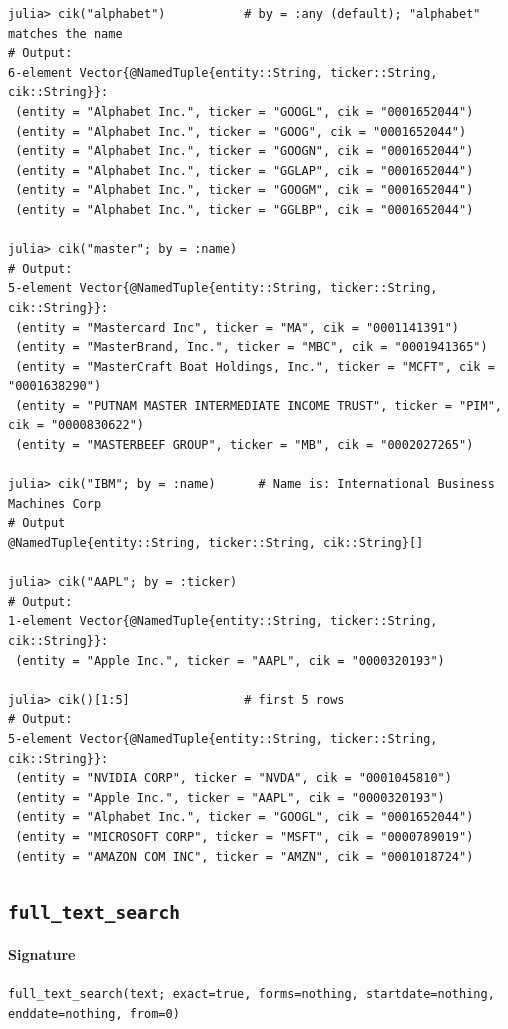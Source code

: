 \documentclass[11pt,a4paper]{report}
\newcommand{\sig}[1]{\medskip\noindent\texttt{#1}\par\medskip}
\begin{document}
\begin{lstlisting}
julia> cik("alphabet")           # by = :any (default); "alphabet" matches the name
# Output:
6-element Vector{@NamedTuple{entity::String, ticker::String, cik::String}}:
 (entity = "Alphabet Inc.", ticker = "GOOGL", cik = "0001652044")
 (entity = "Alphabet Inc.", ticker = "GOOG", cik = "0001652044")
 (entity = "Alphabet Inc.", ticker = "GOOGN", cik = "0001652044")
 (entity = "Alphabet Inc.", ticker = "GGLAP", cik = "0001652044")
 (entity = "Alphabet Inc.", ticker = "GOOGM", cik = "0001652044")
 (entity = "Alphabet Inc.", ticker = "GGLBP", cik = "0001652044")

julia> cik("master"; by = :name)
# Output:
5-element Vector{@NamedTuple{entity::String, ticker::String, cik::String}}:
 (entity = "Mastercard Inc", ticker = "MA", cik = "0001141391")
 (entity = "MasterBrand, Inc.", ticker = "MBC", cik = "0001941365")
 (entity = "MasterCraft Boat Holdings, Inc.", ticker = "MCFT", cik = "0001638290")
 (entity = "PUTNAM MASTER INTERMEDIATE INCOME TRUST", ticker = "PIM", cik = "0000830622")
 (entity = "MASTERBEEF GROUP", ticker = "MB", cik = "0002027265")

julia> cik("IBM"; by = :name)      # Name is: International Business Machines Corp
# Output
@NamedTuple{entity::String, ticker::String, cik::String}[]

julia> cik("AAPL"; by = :ticker)
# Output:
1-element Vector{@NamedTuple{entity::String, ticker::String, cik::String}}:
 (entity = "Apple Inc.", ticker = "AAPL", cik = "0000320193")

julia> cik()[1:5]                # first 5 rows
# Output:
5-element Vector{@NamedTuple{entity::String, ticker::String, cik::String}}:
 (entity = "NVIDIA CORP", ticker = "NVDA", cik = "0001045810")
 (entity = "Apple Inc.", ticker = "AAPL", cik = "0000320193")
 (entity = "Alphabet Inc.", ticker = "GOOGL", cik = "0001652044")
 (entity = "MICROSOFT CORP", ticker = "MSFT", cik = "0000789019")
 (entity = "AMAZON COM INC", ticker = "AMZN", cik = "0001018724")
\end{lstlisting}

\subsection{\texttt{full\_text\_search}}

\paragraph{Signature}
\begin{description}
  \item[\sig{full\_text\_search(text; exact=true, forms=nothing, startdate=nothing, enddate=nothing, from=0)}]
\end{description}
\end{document}
